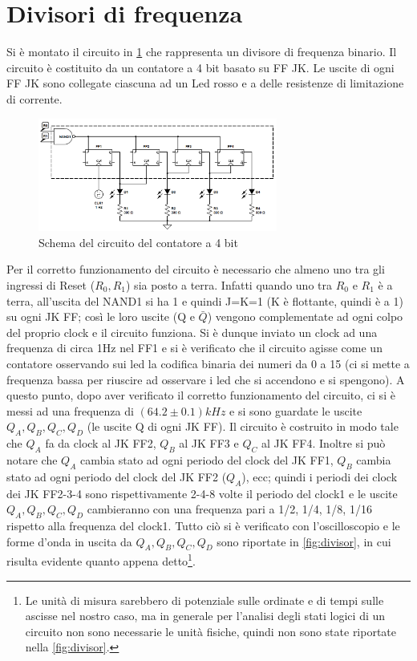 \documentclass[a4paper,10pt]{article}
\begin{document}


\section{Divisori di frequenza}
Si è montato il circuito in \cref{fig:counter} che rappresenta un divisore di frequenza binario.
Il circuito è costituito da un contatore a 4 bit basato su FF JK. Le uscite di ogni FF JK sono collegate
ciascuna ad un Led rosso e a delle resistenze di limitazione di corrente.

\begin{figure}[H]
	\centering
	\includegraphics[width=0.7\textwidth]{../grafici/counterScheme.png}
	\caption{Schema del circuito del contatore a 4 bit}
	\label{fig:counter}
\end{figure}


Per il corretto funzionamento del circuito è necessario che almeno uno tra gli ingressi di Reset ($R_0 , R_1$)
sia posto a terra. Infatti quando uno tra $R_0$ e $R_1$ è a terra, all'uscita del NAND1 si ha 1 e quindi J=K=1 (K è flottante, quindi è a 1) su ogni JK FF; così le loro uscite (Q e $\bar{Q}$) vengono complementate ad ogni colpo del proprio clock e il circuito funziona.
\newline
\newline
Si è dunque inviato un clock ad una frequenza di circa 1Hz nel FF1 e si è verificato
che il circuito agisse come un contatore osservando sui led la codifica binaria dei numeri da 0 
a 15 (ci si mette a frequenza bassa per riuscire ad osservare i led che si accendono e si spengono).
A questo punto, dopo aver verificato il corretto funzionamento del circuito, ci si è messi ad
una frequenza di $(64.2 \pm 0.1)kHz$ e si sono guardate le uscite $Q_A,Q_B,Q_C,Q_D$ (le uscite Q di ogni JK FF). Il circuito è costruito in modo tale che $Q_A$ fa da clock al JK FF2, $Q_B$ al JK FF3 e $Q_C$ al JK FF4. Inoltre si può notare che $Q_A$ cambia stato ad ogni periodo del clock del JK FF1, $Q_B$ cambia stato ad ogni periodo del clock del JK FF2 ($Q_A$), ecc; quindi i periodi dei clock dei JK FF2-3-4 sono rispettivamente 2-4-8 volte il periodo del clock1 e le uscite $Q_A,Q_B,Q_C,Q_D$ cambieranno con una frequenza pari a 1/2, 1/4, 1/8, 1/16 rispetto alla frequenza del  clock1. Tutto ciò si è verificato con l'oscilloscopio e le forme d'onda in uscita da $Q_A,Q_B,Q_C,Q_D$ sono riportate in \cref{fig:divisor}, in cui risulta evidente quanto appena detto\footnote{Le unità di misura sarebbero di potenziale sulle ordinate e di tempi sulle ascisse nel nostro caso, ma in generale per l'analisi degli stati logici di un circuito non sono necessarie le unità fisiche, quindi non sono state riportate nella \cref{fig:divisor}.}.
\end{document}
